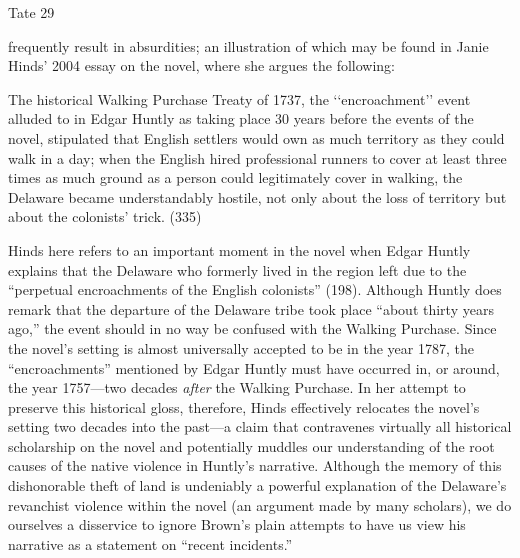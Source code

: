 \begin{tcolorbox}[enhanced,width=4.2in,left=.35in, right=.35in,
   drop fuzzy shadow southeast,
    boxrule=0.4pt,sharp corners,colframe=black!80!black,colback=white!10]

\medskip

{\scriptsize \begin{flushright} Tate 29 \end{flushright}
\begin{doublespacing}
frequently result in absurdities; an illustration of which may be found in Janie Hinds' 2004 essay on the novel, where she argues the following:
\begin{myenv}The historical Walking Purchase Treaty of 1737, the ‘‘encroachment’’ event alluded to in Edgar Huntly as taking place 30 years before the events of the novel, stipulated that English settlers would own as much territory as they could walk in a day; when the English hired professional runners to cover at least three times as much ground as a person could legitimately cover in walking, the Delaware became understandably hostile, not only about the loss of territory but about the colonists’ trick. (335)\end{myenv}
Hinds here refers to an important moment in the novel when Edgar Huntly explains that the Delaware who formerly lived in the region left due to the “perpetual encroachments of the English colonists” (198). Although Huntly does remark that the departure of the Delaware tribe took place “about thirty years ago,” the event should in no way be confused with the Walking Purchase. Since the novel's setting is almost universally accepted to be in the year 1787, the “encroachments” mentioned by Edgar Huntly must have occurred in, or around, the year 1757—two decades \emph{after} the Walking Purchase. In her attempt to preserve this historical gloss, therefore, Hinds effectively relocates the novel's setting two decades into the past—a claim that contravenes virtually all historical scholarship on the novel and potentially muddles our understanding of the root causes of the native violence in Huntly's narrative. Although the memory of this dishonorable theft of land is undeniably a powerful explanation of the Delaware's revanchist violence within the novel (an argument made by many scholars), we do ourselves a disservice to ignore Brown's plain attempts to have us view his narrative as a statement on “recent incidents.”

\end{doublespacing}}

\bigskip
\smallskip
\smallskip

\end{tcolorbox}




